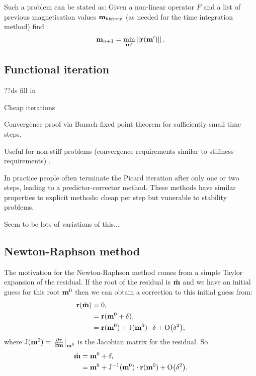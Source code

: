 Such a problem can be stated as:
Given a non-linear operator $F$ and a list of previous magnetisation values $\mathbf{m}_{\text{history}}$ (as needed for the time integration method) find
\begin{equation}
  \label{eq:non-lin-system}
  \mathbf{m}_{n+1} = \min_{\mathbf{m}'} \left| \left| \mathbf{r}(\mathbf{m}') \right| \right|.
\end{equation}


\subsection{Functional iteration}
\label{sec:picard}

??ds fill in

Cheap iterations

Convergence proof via Banach fixed point theorem for sufficiently small time steps.

Useful for non-stiff problems (convergence requirements similar to stiffness requirements) \cite{Iserles2009}.

In practice people often terminate the Picard iteration after only one or two steps, leading to a predictor-corrector method. 
These methods have similar properties to explicit methods: cheap per step but vunerable to stability problems.

Seem to be lots of variations of this...

\subsection{Newton-Raphson method}
\label{sec:newt-raph}

The motivation for the Newton-Raphson method comes from a simple Taylor expansion of the residual.
If the root of the residual is $\hat{\mathbf{m}}$ and we have an initial guess for this root $\mathbf{m}^0$ then we can obtain a correction to this initial guess from:
\begin{equation}
  \begin{aligned}
    \mathbf{r}(\hat{\mathbf{m}}) &= 0, \\
    &= \mathbf{r}(\mathbf{m}^0 + \mathbf{\delta}), \\
    &= \mathbf{r}(\mathbf{m}^0) + \mathrm{J}(\mathbf{m}^0) \cdot \mathbf{\delta} + \text{O}{\left( \mathbf{\delta}^2 \right)},
  \end{aligned}
\end{equation}
where $\mathrm{J}(\mathbf{m}^0) = {\left. {\frac{\partial \mathbf{r}}{\partial \mathbf{m}}} \right|_{\mathbf{m}^0}}$ is the Jacobian matrix for the residual.
So
\begin{equation}
  \begin{aligned}
    \label{eq:49}
    \hat{\mathbf{m}} &= \mathbf{m}^0 + \mathbf{\delta}, \\
    &= \mathbf{m}^0 + \mathrm{J}^{-1}(\mathbf{m}^0) \cdot \mathbf{r}(\mathbf{m}^0) + \text{O}{\left( \mathbf{\delta}^2 \right)}.
  \end{aligned}
\end{equation}

